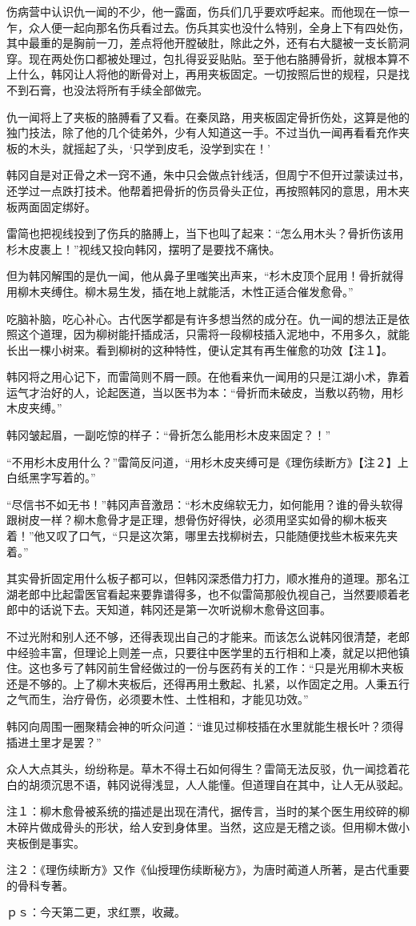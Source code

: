 伤病营中认识仇一闻的不少，他一露面，伤兵们几乎要欢呼起来。而他现在一惊一乍，众人便一起向那名伤兵看过去。伤兵其实也没什么特别，全身上下有四处伤，其中最重的是胸前一刀，差点将他开膛破肚，除此之外，还有右大腿被一支长箭洞穿。现在两处伤口都被处理过，包扎得妥妥贴贴。至于他右胳膊骨折，就根本算不上什么，韩冈让人将他的断骨对上，再用夹板固定。一切按照后世的规程，只是找不到石膏，也没法将所有手续全部做完。

仇一闻将上了夹板的胳膊看了又看。在秦凤路，用夹板固定骨折伤处，这算是他的独门技法，除了他的几个徒弟外，少有人知道这一手。不过当仇一闻再看看充作夹板的木头，就摇起了头，‘只学到皮毛，没学到实在！’

韩冈自是对正骨之术一窍不通，朱中只会做点针线活，但周宁不但开过蒙读过书，还学过一点跌打技术。他帮着把骨折的伤员骨头正位，再按照韩冈的意思，用木夹板两面固定绑好。

雷简也把视线投到了伤兵的胳膊上，当下也叫了起来：“怎么用木头？骨折伤该用杉木皮裹上！”视线又投向韩冈，摆明了是要找不痛快。

但为韩冈解围的是仇一闻，他从鼻子里嗤笑出声来，“杉木皮顶个屁用！骨折就得用柳木夹缚住。柳木易生发，插在地上就能活，木性正适合催发愈骨。”

吃脑补脑，吃心补心。古代医学都是有许多想当然的成分在。仇一闻的想法正是依照这个道理，因为柳树能扦插成活，只需将一段柳枝插入泥地中，不用多久，就能长出一棵小树来。看到柳树的这种特性，便认定其有再生催愈的功效【注１】。

韩冈将之用心记下，而雷简则不屑一顾。在他看来仇一闻用的只是江湖小术，靠着运气才治好的人，论起医道，当以医书为本：“骨折而未破皮，当敷以药物，用杉木皮夹缚。”

韩冈皱起眉，一副吃惊的样子：“骨折怎么能用杉木皮来固定？！”

“不用杉木皮用什么？”雷简反问道，“用杉木皮夹缚可是《理伤续断方》【注２】上白纸黑字写着的。”

“尽信书不如无书！”韩冈声音激昂：“杉木皮绵软无力，如何能用？谁的骨头软得跟树皮一样？柳木愈骨才是正理，想骨伤好得快，必须用坚实如骨的柳木板夹着！”他又叹了口气，“只是这次第，哪里去找柳树去，只能随便找些木板来先夹着。”

其实骨折固定用什么板子都可以，但韩冈深悉借力打力，顺水推舟的道理。那名江湖老郎中比起雷医官看起来要靠谱得多，也不似雷简那般仇视自己，当然要顺着老郎中的话说下去。天知道，韩冈还是第一次听说柳木愈骨这回事。

不过光附和别人还不够，还得表现出自己的才能来。而该怎么说韩冈很清楚，老郎中经验丰富，但理论上则差一点，只要往中医学里的五行相和上凑，就足以把他镇住。这也多亏了韩冈前生曾经做过的一份与医药有关的工作：“只是光用柳木夹板还是不够的。上了柳木夹板后，还得再用土敷起、扎紧，以作固定之用。人秉五行之气而生，治疗骨伤，必须要木性、土性相和，才能见功效。”

韩冈向周围一圈聚精会神的听众问道：“谁见过柳枝插在水里就能生根长叶？须得插进土里才是罢？”

众人大点其头，纷纷称是。草木不得土石如何得生？雷简无法反驳，仇一闻捻着花白的胡须沉思不语，韩冈说得浅显，人人能懂。但道理自在其中，让人无从驳起。

注１：柳木愈骨被系统的描述是出现在清代，据传言，当时的某个医生用绞碎的柳木碎片做成骨头的形状，给人安到身体里。当然，这应是无稽之谈。但用柳木做小夹板倒是事实。

注２：《理伤续断方》又作《仙授理伤续断秘方》，为唐时蔺道人所著，是古代重要的骨科专著。

ｐｓ：今天第二更，求红票，收藏。

